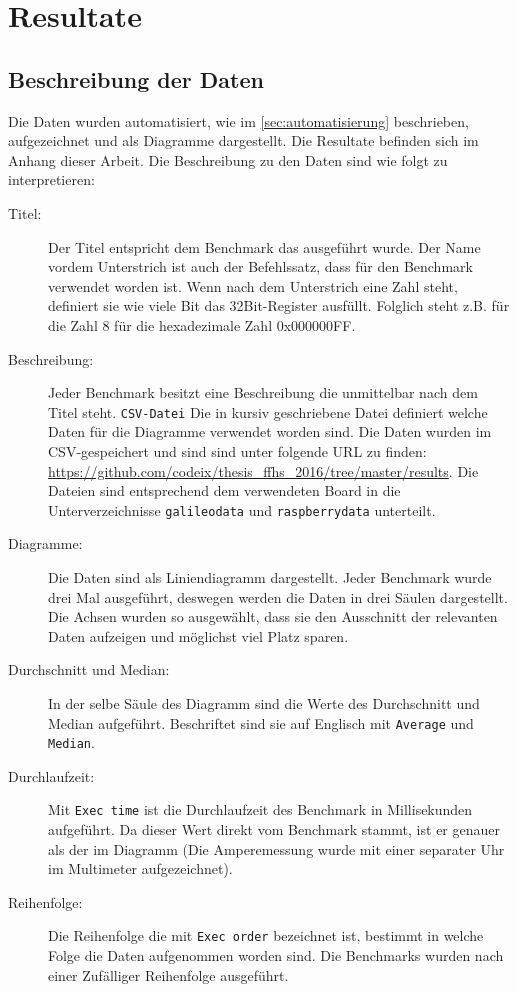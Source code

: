 \chapter{Resultate}

\section{Beschreibung der Daten}

Die Daten wurden automatisiert, wie im \autoref{sec:automatisierung} beschrieben, aufgezeichnet und als Diagramme dargestellt. Die Resultate befinden sich im Anhang dieser Arbeit. Die Beschreibung zu den Daten sind wie folgt zu interpretieren:

\begin{description}
\item[Titel:]
Der Titel entspricht dem Benchmark das ausgeführt wurde. Der Name vordem Unterstrich ist auch der Befehlssatz, dass für den Benchmark verwendet worden ist. Wenn nach dem Unterstrich eine Zahl steht, definiert sie wie viele Bit das 32Bit-Register ausfüllt. Folglich steht z.B. für die Zahl 8 für die hexadezimale Zahl 0x000000FF.
\item[Beschreibung:]
Jeder Benchmark besitzt eine Beschreibung die unmittelbar nach dem Titel steht.
\texttt{CSV-Datei} Die in kursiv geschriebene Datei definiert welche Daten für die Diagramme verwendet worden sind. Die Daten wurden im CSV-gespeichert und sind sind unter folgende URL zu finden: \url{https://github.com/codeix/thesis_ffhs_2016/tree/master/results}. Die Dateien sind entsprechend dem verwendeten Board in die Unterverzeichnisse \texttt{galileodata} und \texttt{raspberrydata} unterteilt. 
\item[Diagramme:]
Die Daten sind als Liniendiagramm dargestellt. Jeder Benchmark wurde drei Mal ausgeführt, deswegen werden die Daten in drei Säulen dargestellt. Die Achsen wurden so ausgewählt, dass sie den Ausschnitt der relevanten Daten aufzeigen und möglichst viel Platz sparen.
\item[Durchschnitt und Median:]
In der selbe Säule des Diagramm sind die Werte des Durchschnitt und Median aufgeführt. Beschriftet sind sie auf Englisch mit \texttt{Average} und \texttt{Median}.
\item[Durchlaufzeit:]
Mit \texttt{Exec time} ist die Durchlaufzeit des Benchmark in Millisekunden aufgeführt. Da dieser Wert direkt vom Benchmark stammt, ist er genauer als der im Diagramm (Die Amperemessung wurde mit einer separater Uhr im Multimeter aufgezeichnet).
\item[Reihenfolge:] Die Reihenfolge die mit \texttt{Exec order} bezeichnet ist, bestimmt in welche Folge die Daten aufgenommen worden sind. Die Benchmarks wurden nach einer Zufälliger Reihenfolge ausgeführt.

\end{description}



